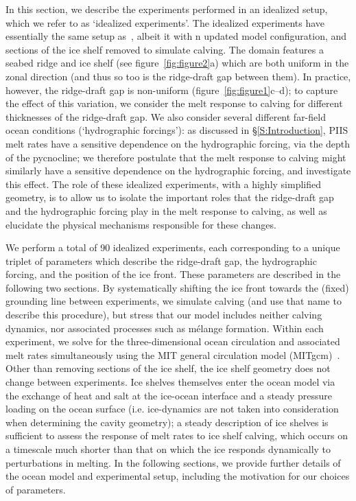 \documentclass[draft]{agujournal2019}
\begin{document}
In this section, we describe the experiments performed in an idealized setup, which we refer to as `idealized experiments'. The idealized experiments have essentially the same setup as~, albeit it with n updated model configuration, and sections of the ice shelf removed to simulate calving. The domain features a seabed ridge and ice shelf (see figure~\ref{fig:figure2}a) which are both uniform in the zonal direction (and thus so too is the ridge-draft gap between them). In practice, however, the ridge-draft gap is non-uniform (figure~\ref{fig:figure1}c--d); to capture the effect of this variation, we consider the melt response to calving for different thicknesses of the ridge-draft gap. We also consider several different far-field ocean conditions (`hydrographic forcings'): as discussed in \S\ref{S:Introduction}, PIIS melt rates have a sensitive dependence on the hydrographic forcing, via the depth of the pycnocline; we therefore postulate that the melt response to calving might similarly have a sensitive dependence on the hydrographic forcing, and investigate this effect. The role of these idealized experiments, with a highly simplified geometry, is to allow us to isolate the important roles that the ridge-draft gap and the hydrographic forcing play in the melt response to calving, as well as elucidate the physical mechanisms responsible for these changes.

We perform a total of 90 idealized experiments, each corresponding to a unique triplet of parameters which describe the ridge-draft gap, the hydrographic forcing, and the position of the ice front. These parameters are described in the following two sections. By systematically shifting the ice front towards the (fixed) grounding line between experiments, we simulate calving (and use that name to describe this procedure), but stress that our model includes neither calving dynamics, nor associated processes such as mélange formation. Within each experiment, we solve for the three-dimensional ocean circulation and associated melt rates simultaneously using the MIT general circulation model (MITgcm)~\cite{Marshall1997JGROceans}. Other than removing sections of the ice shelf, the ice shelf geometry does not change between experiments. Ice shelves themselves enter the ocean model via the exchange of heat and salt at the ice-ocean interface and a steady pressure loading on the ocean surface (i.e. ice-dynamics are not taken into  consideration when determining the cavity geometry); a steady description of ice shelves is sufficient to assess the response of melt rates to ice shelf calving, which occurs on a timescale much shorter than that on which the ice responds dynamically to perturbations in melting. In the following sections, we provide further details of the ocean model and experimental setup, including the motivation for our choices of parameters.
\end{document}
